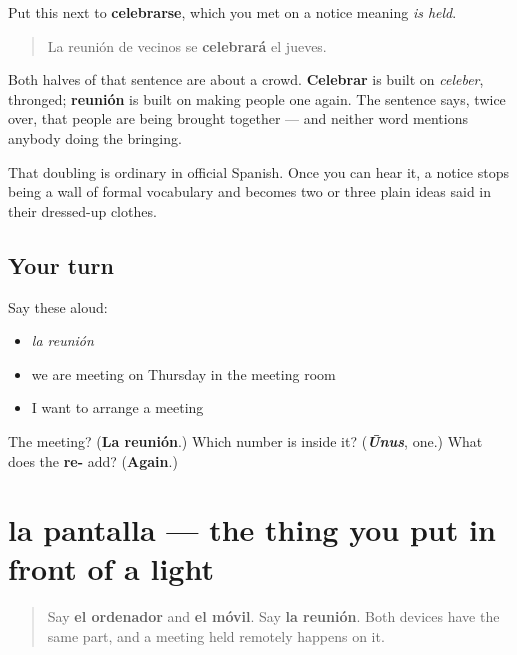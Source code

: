 \begin{culture}
Put this next to \textbf{celebrarse}, which you met on a notice meaning \emph{is held}.

\begin{quote}
La reunión de vecinos se \textbf{celebrará} el jueves.
\end{quote}

Both halves of that sentence are about a crowd. \textbf{Celebrar} is built on \emph{celeber}, thronged; \textbf{reunión} is built on making people one again. The sentence says, twice over, that people are being brought together — and neither word mentions anybody doing the bringing.

That doubling is ordinary in official Spanish. Once you can hear it, a notice stops being a wall of formal vocabulary and becomes two or three plain ideas said in their dressed-up clothes.
\end{culture}

\subsection*{Your turn}
Say these aloud:

\begin{itemize}
\raggedright
  \item \emph{la reunión}
  \item we are meeting on Thursday in the meeting room
  \item I want to arrange a meeting
\end{itemize}

\begin{tcolorbox}[breakable,colback=teal!4,colframe=teal!35!black,title={Before you move on}]
The meeting? (\textbf{La reunión}.) Which number is inside it? (\emph{\textbf{Ūnus}}, one.) What does the \textbf{re-} add? (\textbf{Again}.)
\end{tcolorbox}
\section[la pantalla]{la pantalla — the thing you put in front of a light}

\label{lesson:ES-C442-pantalla}



\begin{quote}
Say \textbf{el ordenador} and \textbf{el móvil}. Say \textbf{la reunión}. Both devices have the same part, and a meeting held remotely happens on it.
\end{quote}

